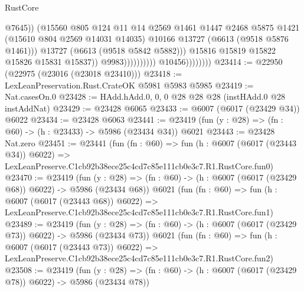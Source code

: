 \begin{lexlean}{RustCore}
\begin{coremodule}
                                                  @7645))
                                              (@15560
                                                @805
                                                @124
                                                @11
                                                @14
                                                @2569
                                                @1461
                                                @1447
                                                @2468
                                                @5875
                                                @1421
                                                (@15610 @804 @2569 @14031 @14035)
                                                @10166
                                                @13727
                                                (@6613 (@9518 @5876 @1461)))
                                              @13727
                                              (@6613 (@9518 @5842 @5882)))
                                            @15816
                                            @15819
                                            @15822
                                            @15826
                                            @15831
                                            @15837))
                                        @9983))))))))))
                    @10456))))))))
@23414 := @22950 (@22975 (@23016 (@23018 @23410)))
@23418 := LexLeanPreservation.Rust.CrateOK @5981 @5983 @5985
@23419 := Nat.casesOn.{0}
@23428 := HAdd.hAdd.{0, 0, 0} @28 @28 @28 (instHAdd.{0} @28 instAddNat)
@23429 := @23428 @6065
@23433 := @6007 (@6017 (@23429 @34)) @6022
@23434 := @23428 @6063
@23441 := @23419 (fun (y : @28) => (fn : @60) -> (h : @23433) -> @5986 (@23434 @34)) @6021
@23443 := @23428 Nat.zero
@23451 := @23441
    (fun (fn : @60) =>
    fun (h : @6007 (@6017 (@23443 @34)) @6022) =>
    LexLeanPreserve.C1cb92b38ece25c4cd7c85e111cb0e3c7.R1.RustCore.fun0)
@23470 := @23419
    (fun (y : @28) => (fn : @60) -> (h : @6007 (@6017 (@23429 @68)) @6022) -> @5986 (@23434 @68))
    @6021
    (fun (fn : @60) =>
    fun (h : @6007 (@6017 (@23443 @68)) @6022) =>
    LexLeanPreserve.C1cb92b38ece25c4cd7c85e111cb0e3c7.R1.RustCore.fun1)
@23489 := @23419
    (fun (y : @28) => (fn : @60) -> (h : @6007 (@6017 (@23429 @73)) @6022) -> @5986 (@23434 @73))
    @6021
    (fun (fn : @60) =>
    fun (h : @6007 (@6017 (@23443 @73)) @6022) =>
    LexLeanPreserve.C1cb92b38ece25c4cd7c85e111cb0e3c7.R1.RustCore.fun2)
@23508 := @23419
    (fun (y : @28) => (fn : @60) -> (h : @6007 (@6017 (@23429 @78)) @6022) -> @5986 (@23434 @78))

\end{coremodule}
\end{lexlean}
